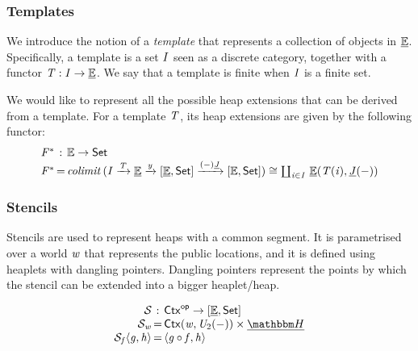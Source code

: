 \subsubsection{Templates}

We introduce the notion of a \emph{template} that represents a collection of objects in $\underline{\mathbb{E}}$.
Specifically, a template is a set $\mathit{I}$ seen as a discrete category, together with a functor $\mathit{T} : \mathit{I} \to \underline{\mathbb{E}}$.
We say that a template is finite when $\mathit{I}$ is a finite set.

We would like to represent all the possible heap extensions that can be derived from a template.
For a template $\mathit{T}$, its heap extensions are given by the following functor:
\[\begin{array}{r@{\,}c@{\,}l}
    \templateExt\vF & : & \initC \to \setC \\
    \templateExt\vF & = & \colimit(\vI \xrightarrow\vT \dinitC \xrightarrow\vy \funC\dinitC\setC \xrightarrow{(\dash)\initInclF} \funC\initC\setC)
                                    \iso \Coprod{\vi \in \vI} \homF\dinitC{\vT(\vi)}{\initInclF(\dash)}
\end{array}\]

\subsubsection{Stencils}

Stencils are used to represent heaps with a common segment.
It is parametrised over a world $\mathit{w}$ that represents the public locations, and it is defined using heaplets with dangling pointers. 
Dangling pointers represent the points by which the stencil can be extended into a bigger heaplet/heap.

\[\begin{array}{r@{\,}c@{\,}l}
    \stencilF\nop & : & \opC\ctxC \to \funC\dinitC\setC \\
    \stencilF\vw & = & \homF\ctxC\vw{\vU_2(\dash)} \times \dheapF \\
    \stencilF\vf\tup\vg\vh & = & \tup{\vg \comp \vf}\vh
\end{array}\]

